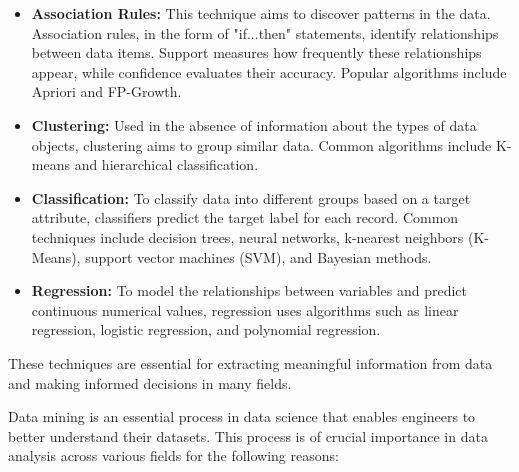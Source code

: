 \begin{itemize}
	\item \textbf{Association Rules:} This technique aims to discover patterns in the data. Association rules, in the form of "if...then" statements, identify relationships between data items. Support measures how frequently these relationships appear, while confidence evaluates their accuracy. Popular algorithms include Apriori and FP-Growth.
	
	\item \textbf{Clustering:} Used in the absence of information about the types of data objects, clustering aims to group similar data. Common algorithms include K-means and hierarchical classification.
	
	\item \textbf{Classification:} To classify data into different groups based on a target attribute, classifiers predict the target label for each record. Common techniques include decision trees, neural networks, k-nearest neighbors (K-Means), support vector machines (SVM), and Bayesian methods.
	
	\item \textbf{Regression:} To model the relationships between variables and predict continuous numerical values, regression uses algorithms such as linear regression, logistic regression, and polynomial regression.
\end{itemize}

These techniques are essential for extracting meaningful information from data and making informed decisions in many fields.


Data mining is an essential process in data science that enables engineers to better understand their datasets. This process is of crucial importance in data analysis across various fields for the following reasons:

